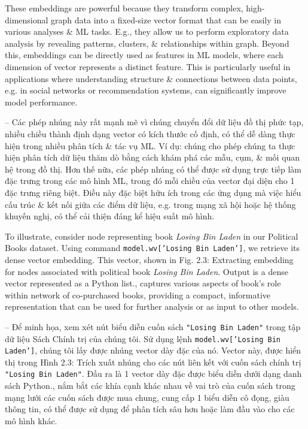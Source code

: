 \documentclass{article}
\begin{document}
\begin{itemize}
\begin{itemize}
\begin{itemize}
           These embeddings are powerful because they transform complex, high-dimensional graph data into a fixed-size vector format that can be easily in various analyses \& ML tasks. E.g., they allow us to perform exploratory data analysis by revealing patterns, clusters, \& relationships within graph. Beyond this, embeddings can be directly used as features in ML models, where each dimension of vector represents a distinct feature. This is particularly useful in applications where understanding structure \& connections between data points, e.g. in social networks or recommendation systems, can significantly improve model performance.

           -- Các phép nhúng này rất mạnh mẽ vì chúng chuyển đổi dữ liệu đồ thị phức tạp, nhiều chiều thành định dạng vector có kích thước cố định, có thể dễ dàng thực hiện trong nhiều phân tích \& tác vụ ML. Ví dụ: chúng cho phép chúng ta thực hiện phân tích dữ liệu thăm dò bằng cách khám phá các mẫu, cụm, \& mối quan hệ trong đồ thị. Hơn thế nữa, các phép nhúng có thể được sử dụng trực tiếp làm đặc trưng trong các mô hình ML, trong đó mỗi chiều của vector đại diện cho 1 đặc trưng riêng biệt. Điều này đặc biệt hữu ích trong các ứng dụng mà việc hiểu cấu trúc \& kết nối giữa các điểm dữ liệu, e.g. trong mạng xã hội hoặc hệ thống khuyến nghị, có thể cải thiện đáng kể hiệu suất mô hình.

           To illustrate, consider node representing book {\it Losing Bin Laden} in our Political Books dataset. Using command {\tt model.wv['Losing Bin Laden']}, we retrieve its dense vector embedding. This vector, shown in {\sf Fig. 2.3: Extracting embedding for nodes associated with political book {\it Losing Bin Laden}. Output is a dense vector represented as a Python list.}, captures various aspects of book's role within network of co-purchased books, providing a compact, informative representation that can be used for further analysis or as input to other models.

           -- Để minh họa, xem xét nút biểu diễn cuốn sách {\tt "Losing Bin Laden"} trong tập dữ liệu Sách Chính trị của chúng tôi. Sử dụng lệnh {\tt model.wv['Losing Bin Laden']}, chúng tôi lấy được nhúng vector dày đặc của nó. Vector này, được hiển thị trong {\sf Hình 2.3: Trích xuất nhúng cho các nút liên kết với cuốn sách chính trị {\tt "Losing Bin Laden"}. Đầu ra là 1 vector dày đặc được biểu diễn dưới dạng danh sách Python.}, nắm bắt các khía cạnh khác nhau về vai trò của cuốn sách trong mạng lưới các cuốn sách được mua chung, cung cấp 1 biểu diễn cô đọng, giàu thông tin, có thể được sử dụng để phân tích sâu hơn hoặc làm đầu vào cho các mô hình khác.


\end{itemize}
\end{itemize}
\end{itemize}
\end{document}
